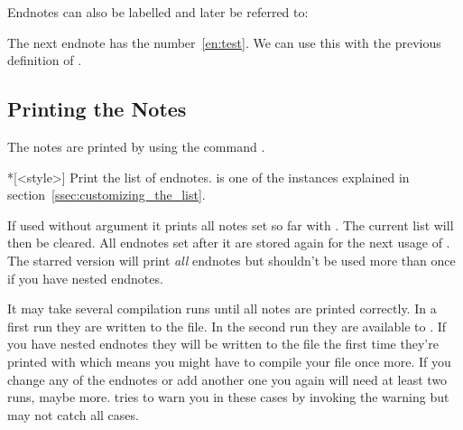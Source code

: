 \documentclass[toc=bib,toc=index]{cnpkgdoc}
\newcommand*\cs[1]{\cmd*{#1}}
\begin{document}
\makeatletter
\def\endnotemark{\@ifnextchar[{\@endnotemark}{\@endnotemark[\theendnote]}}
\def\@endnotemark[#1]{\enotezwritemark{\enmarkstyle#1}}
\makeatother

Endnotes can also be labelled and later be referred to:
\begin{beispiel}
  The next endnote\label{en:test} has
  the number~\ref{en:test}.  We can use this with the previous definition
  of \cs{endnotemark}\endnotemark[\ref{en:test}].
\end{beispiel}

\subsection{Printing the Notes}
The notes are printed by using the command .
\begin{beschreibung}
  *[<style>]\newline
    Print the list of endnotes.  is one of the instances
    explained in section~\ref{ssec:customizing_the_list}.
\end{beschreibung}
If used without argument it prints all notes set so far with
. The current list will then be cleared.  All endnotes set after
it are stored again for the next usage of .  The starred
version will print \emph{all} endnotes but shouldn't be used more than once if
you have nested endnotes.

It may take several compilation runs until all notes are printed correctly.
In a first run they are written to the  file.  In the second run
they are available to .  If you have nested endnotes they
will be written to the  file the first time they're printed with
 which means you might have to compile your file once more.
If you change any of the endnotes or add another one you again will need at
least two runs, maybe more.  \enotez tries to warn you in these cases by
invoking the warning   but may not catch all cases.
\end{document}
